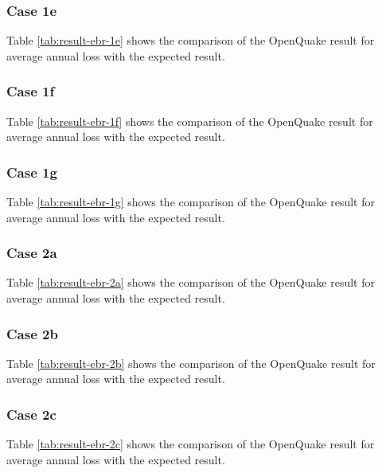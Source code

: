 \subsubsection{Case 1e}


Table \ref{tab:result-ebr-1e} shows the comparison of the OpenQuake result for average annual loss with the expected result.

\subsubsection{Case 1f}


Table \ref{tab:result-ebr-1f} shows the comparison of the OpenQuake result for average annual loss with the expected result.

\subsubsection{Case 1g}


Table \ref{tab:result-ebr-1g} shows the comparison of the OpenQuake result for average annual loss with the expected result.

\subsubsection{Case 2a}


Table \ref{tab:result-ebr-2a} shows the comparison of the OpenQuake result for average annual loss with the expected result.

\subsubsection{Case 2b}


Table \ref{tab:result-ebr-2b} shows the comparison of the OpenQuake result for average annual loss with the expected result.

\subsubsection{Case 2c}


Table \ref{tab:result-ebr-2c} shows the comparison of the OpenQuake result for average annual loss with the expected result.

